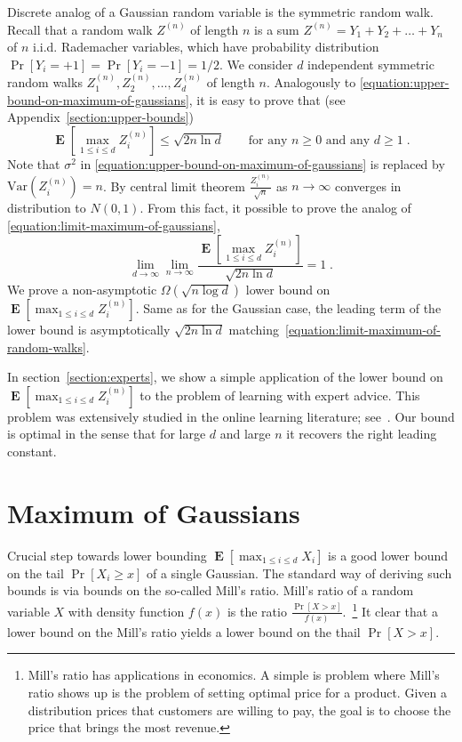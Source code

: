 \documentclass{article}
\DeclareMathOperator*{\Exp}{\mathbf{E}}
\newcommand{\Var}{\mathrm{Var}}
\begin{document}
Discrete analog of a Gaussian random variable is the symmetric random walk. Recall that a random walk $Z^{(n)}$
of length $n$ is a sum $Z^{(n)} = Y_1 + Y_2 + \dots + Y_n$ of $n$ i.i.d. Rademacher variables, which have probability distribution
$\Pr[Y_i = +1] = \Pr[Y_i = -1] = 1/2$. We consider $d$ independent symmetric random walks $Z^{(n)}_1, Z^{(n)}_2, \dots, Z^{(n)}_d$ of length $n$.
Analogously to \eqref{equation:upper-bound-on-maximum-of-gaussians}, it is easy to prove that (see Appendix~\ref{section:upper-bounds})
\begin{equation}
\label{equation:upper-bound-on-maximum-of-random-walks}
\Exp \left[ \max_{1 \le i \le d} Z^{(n)}_i \right] \le \sqrt{2 n \ln d} \qquad \text{for any $n \ge 0$ and any $d \ge 1$}\; .
\end{equation}
Note that $\sigma^2$ in \eqref{equation:upper-bound-on-maximum-of-gaussians} is replaced by $\Var(Z^{(n)}_i) = n$. By central limit theorem $\frac{Z^{(n)}_i}{\sqrt{n}}$
as $n \to \infty$ converges in distribution to $N(0,1)$. From this fact, it possible to prove
the analog of \eqref{equation:limit-maximum-of-gaussians},
\begin{equation}
\label{equation:limit-maximum-of-random-walks}
\lim_{d \to \infty} \lim_{n \to \infty} \frac{\Exp\left[ \max_{1 \le i \le d} Z^{(n)}_i \right]}{\sqrt{2 n \ln d}} = 1 \; .
\end{equation}
We prove a non-asymptotic $\Omega(\sqrt{n \log d})$ lower bound on $\Exp\left[ \max_{1 \le i \le d} Z^{(n)}_i \right]$.
Same as for the Gaussian case, the leading term of the lower bound is asymptotically $\sqrt{2 n \ln d}$
matching~\eqref{equation:limit-maximum-of-random-walks}.

In section~\ref{section:experts}, we show a simple application of the lower
bound on $\Exp\left[\max_{1 \le i \le d} Z^{(n)}_i \right]$ to the problem of learning with
expert advice.  This problem was extensively studied in the online learning
literature; see~\citep{Cesa-BianchiL06}.  Our bound is optimal in the sense
that for large $d$ and large $n$ it recovers the right leading constant.

\section{Maximum of Gaussians}
\label{section:maximum-of-gaussians}

Crucial step towards lower bounding $\Exp \left[ \max_{1 \le i \le d} X_i
\right]$ is a good lower bound on the tail $\Pr[X_i \ge x]$ of a single
Gaussian. The standard way of deriving such bounds is via bounds on the so-called
Mill's ratio.  Mill's ratio of a random variable $X$ with density function
$f(x)$ is the ratio $\frac{\Pr[X > x]}{f(x)}$.~\footnote{Mill's ratio has
applications in economics. A simple is problem where Mill's ratio shows up is
the problem of setting optimal price for a product.  Given a distribution
prices that customers are willing to pay, the goal is to choose the price that
brings the most revenue.} It clear that a lower bound on the Mill's ratio
yields a lower bound on the thail $\Pr[X > x]$.
\end{document}
